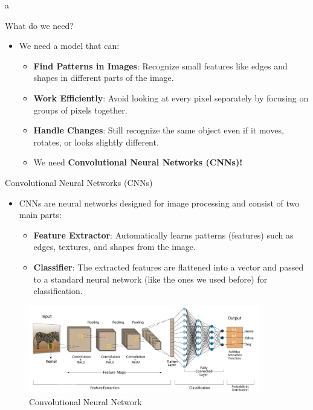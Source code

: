 a\documentclass[10pt]{beamer}
\theoremstyle{remark}
\theoremstyle{definition}
\begin{document}
\begin{frame}{What do we need?}
\begin{itemize}
    \item We need a model that can:
    \begin{itemize}
        \item \textbf{Find Patterns in Images}: Recognize small features like edges and shapes in different parts of the image.
        \item \textbf{Work Efficiently}: Avoid looking at every pixel separately by focusing on groups of pixels together.
        \item \textbf{Handle Changes}: Still recognize the same object even if it moves, rotates, or looks slightly different.
        \item We need \textbf{Convolutional Neural Networks (CNNs)!}

    \end{itemize}
\end{itemize}


\end{frame}

\framebreak

\begin{frame}{Convolutional Neural Networks (CNNs)}

\begin{itemize}
        \item CNNs are neural networks designed for image processing and consist of two main parts:

        \begin{itemize}
            \item \textbf{Feature Extractor}: Automatically learns patterns (features) such as edges, textures, and shapes from the image.
            \item \textbf{Classifier}: The extracted features are flattened into a vector and passed to a standard neural network (like the ones we used before) for classification.
    \end{itemize}
\end{itemize}

\begin{figure}
        \centering
        \includegraphics[width=0.9\textwidth,height=0.7\textheight,keepaspectratio]{./images/cnn_arch.jpeg}
        \caption{Convolutional Neural Network}

        \end{figure}
\end{frame}
\end{document}
